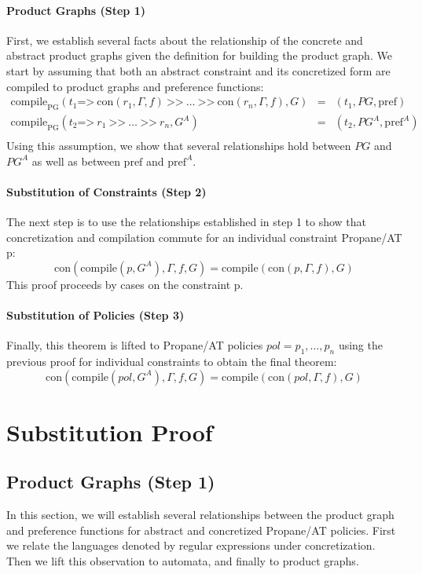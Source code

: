 \documentclass[twocolumn, openany]{sig-alternate-10pt}
\newcommand{\sysname}{{\small \sf Propane/AT}\xspace}
\newcommand{\para}[1]{\paragraph*{\textbf{#1}}}
\newcommand{\Prefer}{\texttt{>>}}
\newcommand{\Path}{\texttt{=>}}
\newcommand{\Con}{\mathrm{con}}
\newcommand{\CompilePg}{\ensuremath{\mathrm{compile}_\mathrm{PG}}}
\newcommand{\Compile}{\ensuremath{\mathrm{compile}}}
\newcommand{\Pref}{\ensuremath{\mathrm{pref}}}
\begin{document}
\para{Product Graphs (Step 1)} First, we establish several facts about the relationship of the concrete and abstract product graphs given the definition for building the product graph. We start by assuming that both an abstract constraint and its concretized form are compiled to product graphs and preference functions: 
%
\[
\begin{array}{lll}
  \CompilePg(t_1 \Path~ \Con(r_1,\Gamma,f) ~\Prefer~ \ldots ~\Prefer~ \Con(r_n,\Gamma,f), G) &=& (t_1, PG, \Pref) \\
  \CompilePg(t_2 \Path~ r_1 ~\Prefer~ \ldots ~\Prefer~ r_n, G^A) &=& (t_2, PG^A, \Pref^A) \\
\end{array}
\]
%
Using this assumption, we show that several relationships hold between $PG$ and $PG^A$ as well as between $\Pref$ and $\Pref^A$. 

\para{Substitution of Constraints (Step 2)} The next step is to use the relationships established in step 1 to show that concretization and compilation commute for an individual constraint \sysname p:
%
$$\Con(\Compile(p, G^A), \Gamma, f, G) = \Compile(\Con(p,\Gamma,f), G)$$
%
This proof proceeds by cases on the constraint p.

\para{Substitution of Policies (Step 3)} Finally, this theorem is lifted to \sysname policies $pol = p_1, \ldots, p_n$ using the previous proof for individual constraints to obtain the final theorem:
%
$$\Con(\Compile(pol,G^A),\Gamma,f,G) = \Compile(\Con(pol,\Gamma,f), G)$$ 

\newpage


\section{Substitution Proof}

\subsection{Product Graphs (Step 1)}
In this section, we will establish several relationships between the product graph and preference functions for abstract and concretized \sysname policies. First we relate the languages denoted by regular expressions under concretization. Then we lift this observation to automata, and finally to product graphs.


\newcommand{\Lang}{\ensuremath{\mathcal{L}}}

\end{document}
